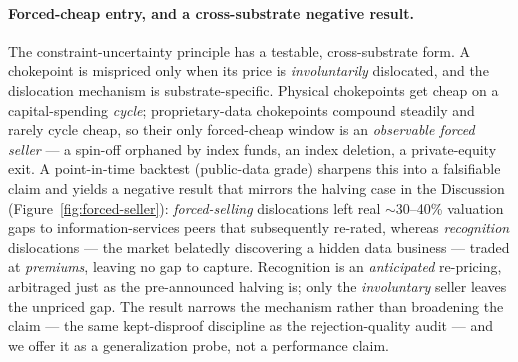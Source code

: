 \documentclass[11pt]{article}
\begin{document}
\paragraph{Forced-cheap entry, and a cross-substrate negative result.} The
constraint-uncertainty principle has a testable, cross-substrate form. A chokepoint
is mispriced only when its price is \emph{involuntarily} dislocated, and the dislocation
mechanism is substrate-specific. Physical chokepoints get cheap on a capital-spending
\emph{cycle}; proprietary-data chokepoints compound steadily and rarely cycle cheap, so
their only forced-cheap window is an \emph{observable forced seller} --- a spin-off
orphaned by index funds, an index deletion, a private-equity exit. A point-in-time
backtest (public-data grade) sharpens this into a falsifiable claim and yields a negative
result that mirrors the halving case in the Discussion (Figure~\ref{fig:forced-seller}):
\emph{forced-selling} dislocations left real $\sim$30--40\% valuation gaps to
information-services peers that subsequently re-rated, whereas \emph{recognition}
dislocations --- the market belatedly discovering a hidden data business --- traded at
\emph{premiums}, leaving no gap to capture. Recognition is an \emph{anticipated}
re-pricing, arbitraged just as the pre-announced halving is; only the \emph{involuntary}
seller leaves the unpriced gap. The result narrows the mechanism rather than broadening
the claim --- the same kept-disproof discipline as the rejection-quality audit --- and we
offer it as a generalization probe, not a performance claim.



\end{document}
